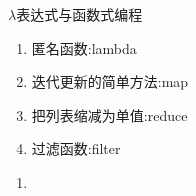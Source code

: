 \documentclass{beamer}
\begin{document}
\begin{frame}{$\lambda$表达式与函数式编程}
\begin{enumerate}
\item 匿名函数:lambda
\item 迭代更新的简单方法:map
\item 把列表缩减为单值:reduce
\item 过滤函数:filter

\end{enumerate}
\end{frame}



\begin{frame}
\begin{enumerate}
\item

\end{enumerate}

\end{frame}
\end{document}

